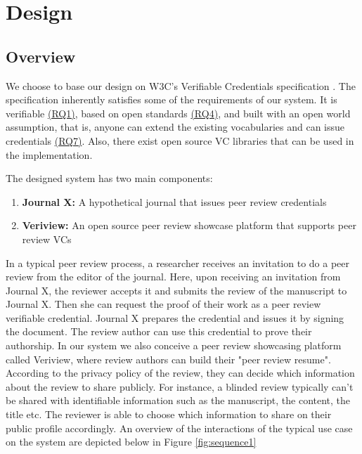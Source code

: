 \section{Design}




\subsection{Overview}

We choose to base our design on W3C's Verifiable Credentials specification \parencite{Sporny.18Kas2019}. The specification inherently satisfies some of the requirements of our system. It is verifiable \hyperref[rq:verifiable]{(RQ1)}, based on open standards \hyperref[rq:open-standards]{(RQ4)}, and built with an open world assumption, that is, anyone can extend the existing vocabularies and can issue credentials \hyperref[rq:compatible]{(RQ7)}. Also, there exist open source \acrshort{VC} libraries that can be used in the implementation.

The designed system has two main components:

\begin{enumerate}
    \item \textbf{Journal X:} A hypothetical journal that issues peer review credentials
    \item \textbf{Veriview:} An open source peer review showcase platform that supports peer review \acrshort{VC}s
\end{enumerate}


In a typical peer review process, a researcher receives an invitation to do a peer review from the editor of the journal. Here, upon receiving an invitation from Journal X, the reviewer accepts it and submits the review of the manuscript to Journal X. Then she can request the proof of their work as a peer review verifiable credential. Journal X prepares the credential and issues it by signing the document. The review author can use this credential to prove their authorship. In our system we also conceive a peer review showcasing platform called Veriview, where review authors can build their "peer review resume". According to the privacy policy of the review, they can decide which information about the review to share publicly. For instance, a blinded review typically can't be shared with identifiable information such as the manuscript, the content, the title etc. The reviewer is able to choose which information to share on their public profile accordingly. An overview of the interactions of the typical use case on the system are depicted below in Figure \ref{fig:sequence1} 

